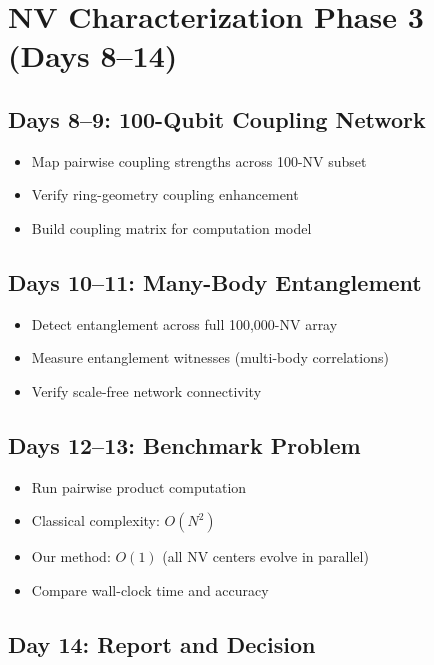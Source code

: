 \documentclass[11pt,a4paper,openany]{book}
\begin{document}
\section{NV Characterization Phase 3 (Days 8--14)}

\subsection{Days 8--9: 100-Qubit Coupling Network}

\begin{itemize}[nosep]
  \item Map pairwise coupling strengths across 100-NV subset
  \item Verify ring-geometry coupling enhancement
  \item Build coupling matrix for computation model
\end{itemize}

\subsection{Days 10--11: Many-Body Entanglement}

\begin{itemize}[nosep]
  \item Detect entanglement across full 100,000-NV array
  \item Measure entanglement witnesses (multi-body correlations)
  \item Verify scale-free network connectivity
\end{itemize}

\subsection{Days 12--13: Benchmark Problem}

\begin{itemize}[nosep]
  \item Run pairwise product computation
  \item Classical complexity: $O(N^2)$
  \item Our method: $O(1)$ (all NV centers evolve in parallel)
  \item Compare wall-clock time and accuracy
\end{itemize}

\subsection{Day 14: Report and Decision}
\end{document}

